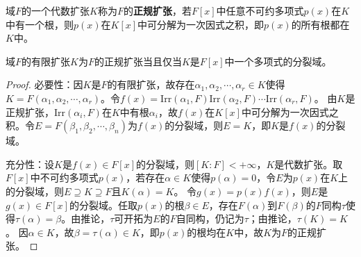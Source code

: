 \documentclass[../../main.tex]{subfiles}%
\begin{document}
\begin{definition}
域$F$的一个代数扩张$K$称为$F$的\textbf{正规扩张}，若$F[x]$中任意不可约多项式$p(x)$在$K$中有一个根，则$p(x)$在$K[x]$中可分解为一次因式之积，即$p(x)$的所有根都在$K$中。
\end{definition}

\begin{theorem}
域$F$的有限扩张$K$为$F$的正规扩张当且仅当$K$是$F[x]$中一个多项式的分裂域。
\end{theorem}

\begin{proof}
必要性：因$K$是$F$的有限扩张，故存在$\alpha_1,\alpha_2,\cdots,\alpha_r\in K$使得$K=F(\alpha_1,\alpha_2,\cdots,\alpha_r)$。令$f(x)=\mathrm{Irr}(\alpha_1,F)\mathrm{Irr}(\alpha_2,F)\cdots\mathrm{Irr}(\alpha_r,F)$。
由$K$是正规扩张，$\mathrm{Irr}(\alpha_i,F)$在$K$中有根$\alpha_i$，故$f(x)$在$K[x]$中可分解为一次因式之积。令$E=F(\beta_1,\beta_2,\cdots,\beta_n)$为$f(x)$的分裂域，则$E=K$，即$K$是$f(x)$的分裂域。

充分性：设$K$是$f(x)\in F[x]$的分裂域，则$[K:F]<+\infty$，$K$是代数扩张。取$F[x]$中不可约多项式$p(x)$，若存在$\alpha\in K$使得$p(\alpha)=0$，令$E$为$p(x)$在$K$上的分裂域，则$E\supseteq K\supseteq F$且$K(\alpha)=K$。
令$g(x)=p(x)f(x)$，则$E$是$g(x)\in F[x]$的分裂域。任取$p(x)$的根$\beta\in E$，存在$F(\alpha)$到$F(\beta)$的$F$同构$\tau$使得$\tau(\alpha)=\beta$。由推论，$\tau$可开拓为$E$的$F$自同构，仍记为$\tau$；由推论，$\tau(K)=K$。
因$\alpha\in K$，故$\beta=\tau(\alpha)\in K$，即$p(x)$的根均在$K$中，故$K$为$F$的正规扩张。
\end{proof}
\end{document}
